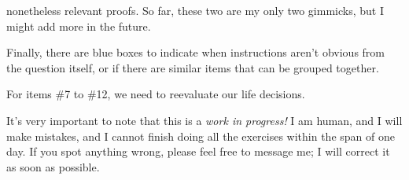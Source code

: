 \documentclass{article}
\begin{document}
nonetheless relevant proofs. So far, these two are my only two gimmicks, but I might add more in the future.\par
{}\par
Finally, there are blue boxes to indicate when instructions aren't obvious from the question itself, or if there are similar items that can be grouped together.\par
\parindent=25pt
    \colorbox{CornflowerBlue!50}{
    \begin{minipage}[c]{0.9\textwidth}
        \centering
        For items \#7 to \#12, we need to reevaluate our life decisions.
    \end{minipage}
    }\parindent=0pt \par 
It's very important to note that this is a \textit{work in progress!} I am human, and I will make mistakes, and I cannot finish doing all the exercises within the span of one day. If you spot anything wrong, 
please feel free to message me; I will correct it as soon as possible.
\pagebreak 
\end{document}
